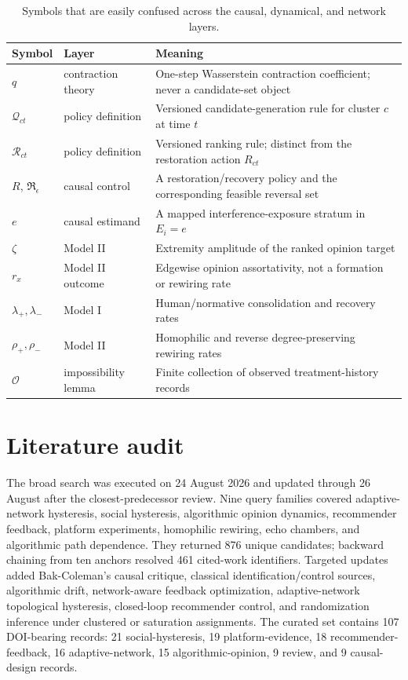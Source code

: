 \documentclass[pdflatex,sn-mathphys-num]{sn-jnl}
\begin{document}
\begin{appendices}
\begin{table}[!htbp]
\centering
\caption{Symbols that are easily confused across the causal, dynamical, and network layers.}
\label{tab:notation-ledger}
\small
\begin{tabularx}{\textwidth}{|p{2.0cm}|p{3.4cm}|Y|}
\hline
\textbf{Symbol} & \textbf{Layer} & \textbf{Meaning}\\
\hline
$q$ & contraction theory & One-step Wasserstein contraction coefficient; never a candidate-set object\\
\hline
$\mathcal Q_{ct}$ & policy definition & Versioned candidate-generation rule for cluster $c$ at time $t$\\
\hline
$\mathcal R_{ct}$ & policy definition & Versioned ranking rule; distinct from the restoration action $R_{ct}$\\
\hline
$R$, $\mathfrak R_\epsilon$ & causal control & A restoration/recovery policy and the corresponding feasible reversal set\\
\hline
$e$ & causal estimand & A mapped interference-exposure stratum in $E_i=e$\\
\hline
$\zeta$ & Model II & Extremity amplitude of the ranked opinion target\\
\hline
$r_x$ & Model II outcome & Edgewise opinion assortativity, not a formation or rewiring rate\\
\hline
$\lambda_+,\lambda_-$ & Model I & Human/normative consolidation and recovery rates\\
\hline
$\rho_+,\rho_-$ & Model II & Homophilic and reverse degree-preserving rewiring rates\\
\hline
$\mathcal O$ & impossibility lemma & Finite collection of observed treatment-history records\\
\hline
\end{tabularx}
\end{table}

\section{Literature audit}

The broad search was executed on 24 August 2026 and updated through 26 August after the closest-predecessor review. Nine query families covered adaptive-network hysteresis, social hysteresis, algorithmic opinion dynamics, recommender feedback, platform experiments, homophilic rewiring, echo chambers, and algorithmic path dependence. They returned 876 unique candidates; backward chaining from ten anchors resolved 461 cited-work identifiers. Targeted updates added Bak-Coleman's causal critique, classical identification/control sources, algorithmic drift, network-aware feedback optimization, adaptive-network topological hysteresis, closed-loop recommender control, and randomization inference under clustered or saturation assignments. The curated set contains 107 DOI-bearing records: 21 social-hysteresis, 19 platform-evidence, 18 recommender-feedback, 16 adaptive-network, 15 algorithmic-opinion, 9 review, and 9 causal-design records.


\end{appendices}
\end{document}
